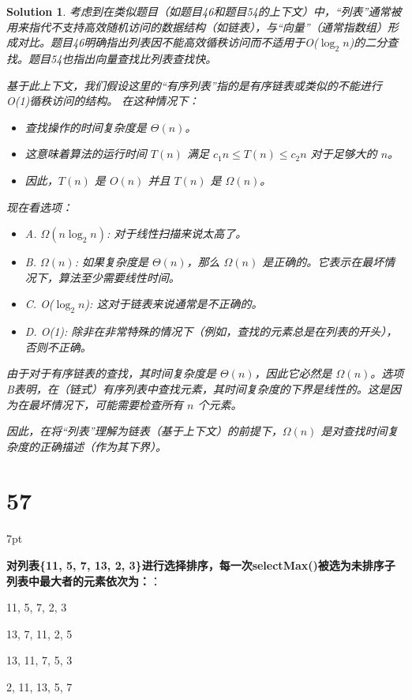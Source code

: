 \documentclass[UTF8]{report}
\newtheorem{solution}{Solution}
\theoremstyle{MyLineTheoremStyle} %
\theoremstyle{MyBlockTheoremStyle} %
\theoremstyle{MySubsubsectionStyle} %
\newenvironment{graybox}{%
        \def\FrameCommand{%
        \hspace{1pt}%
        {\color{gray}\small \vrule width 2pt}%
        {\color{graybox_color}\vrule width 4pt}%
        \colorbox{graybox_color}%
        }%
        \MakeFramed{\advance\hsize-\width\FrameRestore}%
        \noindent\hspace{-4.55pt}%
        \begin{adjustwidth}{}{7pt}%
        \vspace{2pt}\vspace{2pt}%
        }
        {%
        \vspace{2pt}\end{adjustwidth}\endMakeFramed%
        }
\begin{document}
\begin{solution}
考虑到在类似题目（如题目46和题目54的上下文）中，“列表”通常被用来指代不支持高效随机访问的数据结构（如链表），与“向量”（通常指数组）形成对比。题目46明确指出列表因不能高效循秩访问而不适用于O($\log_2 n$)的二分查找。题目54也指出向量查找比列表查找快。

基于此上下文，我们假设这里的“有序列表”指的是有序链表或类似的不能进行O(1)循秩访问的结构。
在这种情况下：
\begin{itemize}
    \item 查找操作的时间复杂度是 $\Theta(n)$。
    \item 这意味着算法的运行时间 $T(n)$ 满足 $c_1 n \le T(n) \le c_2 n$ 对于足够大的 $n$。
    \item 因此，$T(n)$ 是 $O(n)$ 并且 $T(n)$ 是 $\Omega(n)$。
\end{itemize}

现在看选项：
\begin{itemize}
    \item A. $\Omega(n\log_2 n)$: 对于线性扫描来说太高了。
    \item B. $\Omega(n)$: 如果复杂度是 $\Theta(n)$，那么 $\Omega(n)$ 是正确的。它表示在最坏情况下，算法至少需要线性时间。
    \item C. O($\log_2 n$): 这对于链表来说通常是不正确的。
    \item D. O(1): 除非在非常特殊的情况下（例如，查找的元素总是在列表的开头），否则不正确。
\end{itemize}

由于对于有序链表的查找，其时间复杂度是 $\Theta(n)$，因此它必然是 $\Omega(n)$。选项B表明，在（链式）有序列表中查找元素，其时间复杂度的下界是线性的。这是因为在最坏情况下，可能需要检查所有 $n$ 个元素。

因此，在将“列表”理解为链表（基于上下文）的前提下，$\Omega(n)$ 是对查找时间复杂度的正确描述（作为其下界）。
\end{solution}

\section*{57}

\begin{graybox}
\textbf{对列表\{11, 5, 7, 13, 2, 3\}进行选择排序，每一次selectMax()被选为未排序子列表中最大者的元素依次为：}：
\begin{circledenum}
    \item 11, 5, 7, 2, 3
    \item 13, 7, 11, 2, 5
    \item 13, 11, 7, 5, 3
    \item 2, 11, 13, 5, 7
\end{circledenum}
\end{graybox}
\end{document}
